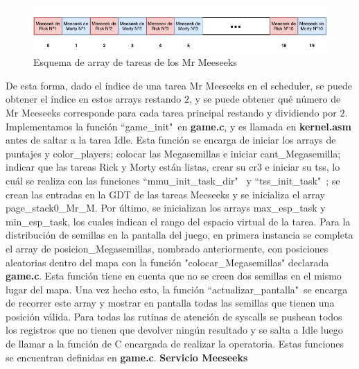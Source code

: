 \documentclass[a4paper]{article}
\begin{document}
\begin{figure}[h]
	\centering
	\includegraphics[scale=0.9]{img/TareasSinRickyMorty.pdf}
	\caption{Esquema de array de tareas de los Mr Meeseeks}
\end{figure}

\justify
De esta forma, dado el índice de una tarea Mr Meeseeks en el scheduler, se puede obtener el índice en estos arrays restando $2$, y se puede obtener qué número de Mr Meeseeks corresponde para cada tarea principal restando y dividiendo por $2$.
\justify
Implementamos la función ``game_init"\ en \textbf{game.c}, y es llamada en \textbf{kernel.asm} antes de saltar a la tarea Idle. Esta función se encarga de iniciar los arrays de puntajes y color_players; colocar las Megasemillas e iniciar cant_Megasemilla; indicar que las tareas Rick y Morty están listas, crear su cr3 e iniciar su tss, lo cuál se realiza con las funciones ``mmu_init_task_dir" \ y ``tss_init_task"\ ; se crean las entradas en la GDT de las tareas Meeseeks y se inicializa el array page_stack0_Mr_M. Por último, se inicializan los arrays max_esp_task y min_esp_task, los cuales indican el rango del espacio virtual de la tarea. 
\justify
Para la distribución de semillas en la pantalla del juego, en primera instancia se completa el array de posicion_Megasemillas, nombrado anteriormente, con posiciones aleatorias dentro del mapa con la función "colocar_Megasemillas" declarada \textbf{game.c}. Esta función tiene en cuenta que no se creen dos semillas en el mismo lugar del mapa. Una vez hecho esto, la función ``actualizar_pantalla"\ se encarga de recorrer este array y mostrar en pantalla todas las semillas que tienen una posición válida.
\justify
Para todas las rutinas de atención de syscalls se pushean todos los registros que no tienen que devolver ningún resultado y se salta a Idle luego de llamar a la función de C encargada de realizar la operatoria. Estas funciones se encuentran definidas en \textbf{game.c}.
\justify
\textbf{Servicio Meeseeks}
\justify
\end{document}
